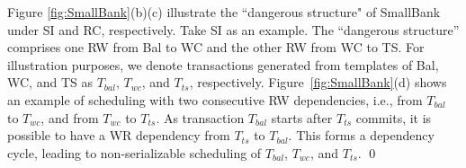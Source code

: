 \begin{example}
\label{exa:dsofsb}
Figure \ref{fig:SmallBank}(b)(c) illustrate the ``dangerous structure" of SmallBank under SI and RC, respectively. Take SI as an example. The ``dangerous structure'' comprises one RW from Bal to WC and the other RW from WC to TS. For illustration purposes, we denote transactions generated from templates of Bal, WC, and TS as $T_{bal}$, $T_{wc}$, and $T_{ts}$, respectively.
Figure~\ref{fig:SmallBank}(d) shows an example of scheduling with two consecutive RW dependencies, i.e., from $T_{bal}$ to $T_{wc}$, and from $T_{wc}$ to $T_{ts}$.
As transaction $T_{bal}$ starts after $T_{ts}$ commits, it is possible to have a 
WR dependency from $T_{ts}$ to $T_{bal}$. This forms a dependency cycle, leading to non-serializable scheduling of $T_{bal}$, $T_{wc}$, and $T_{ts}$.
\qed
\end{example}



